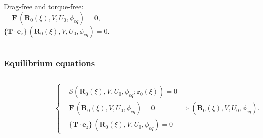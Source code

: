 \documentclass{beamer}
\begin{document}
\begin{frame}
\begin{overlayarea}{\textwidth}{\textheight}
\begin{columns}
Drag-free and torque-free:
\begin{equation*}
	\textbf{F}\,(\textbf{R}_0(\xi), V, U_0, \phi_{eq})=\textbf{0},
\end{equation*}
\begin{equation*}
	\{\mathbf{T}\cdot\textbf{e}_z\}\,(\textbf{R}_0(\xi), V, U_0, \phi_{eq})=0.
\end{equation*} 
\end{columns}
	\end{overlayarea}
\end{frame}



\begin{frame}
	\frametitle{Equilibrium equations}
	\begin{overlayarea}{\textwidth}{\textheight}
		\vspace{-0.8cm}
		\begin{columns}
			\begin{figure}[htb]
				\begin{center}
					\includegraphics[width=1\textwidth]{plots/r0.png}
				\end{center}
			\end{figure}
			\footnotesize
			\begin{equation*}
				\left\{\begin{aligned}
					&\bm{\mathcal{S}}\left(\textbf{R}_0(\xi), V, U_0,\phi_{eq};\textbf{r}_0(\xi)\right)=0\\
					&\textbf{F}\,(\textbf{R}_0(\xi), V, U_0, \phi_{eq})=\textbf{0}\\
					&\{\mathbf{T}\cdot\textbf{e}_z\}\,(\textbf{R}_0(\xi), V, U_0, \phi_{eq})=0
				\end{aligned}\right.\Longrightarrow \left(\textbf{R}_0(\xi), V, U_0, \phi_{eq}\right).
			\end{equation*}
		\vspace{0.1cm}
		

\end{columns}
\end{overlayarea}
\end{frame}
\end{document}
